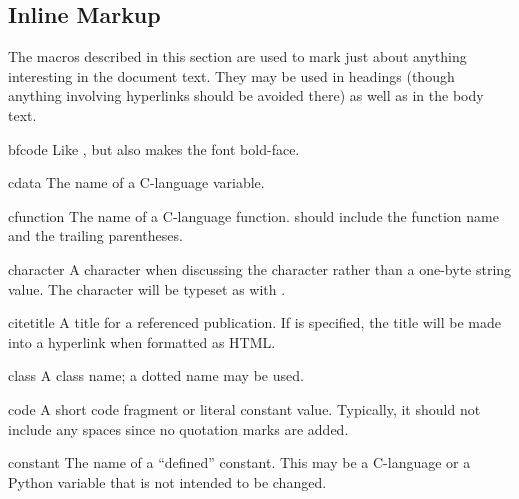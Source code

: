 \documentclass{howto}
\begin{document}
  \subsection{Inline Markup}

    The macros described in this section are used to mark just about
    anything interesting in the document text.  They may be used in
    headings (though anything involving hyperlinks should be avoided
    there) as well as in the body text.

    \begin{macrodesc}{bfcode}{}
      Like , but also makes the font bold-face.
    \end{macrodesc}

    \begin{macrodesc}{cdata}{}
      The name of a C-language variable.
    \end{macrodesc}

    \begin{macrodesc}{cfunction}{}
      The name of a C-language function.   should include the
      function name and the trailing parentheses.
    \end{macrodesc}

    \begin{macrodesc}{character}{}
      A character when discussing the character rather than a one-byte
      string value.  The character will be typeset as with .
    \end{macrodesc}

    \begin{macrodesc}{citetitle}{}
      A title for a referenced publication.  If  is specified,
      the title will be made into a hyperlink when formatted as HTML.
    \end{macrodesc}

    \begin{macrodesc}{class}{}
      A class name; a dotted name may be used.
    \end{macrodesc}

    \begin{macrodesc}{code}{}
      A short code fragment or literal constant value.  Typically, it
      should not include any spaces since no quotation marks are
      added.
    \end{macrodesc}

    \begin{macrodesc}{constant}{}
      The name of a ``defined'' constant.  This may be a C-language
       or a Python variable that is not intended to be
      changed.
    \end{macrodesc}
\end{document}
